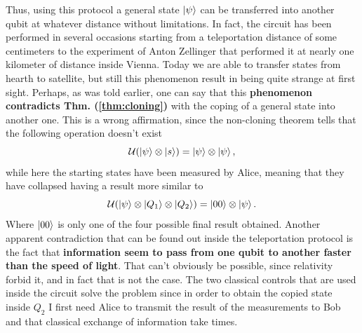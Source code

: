 Thus, using this protocol a general state $\ket{\psi}$ can be transferred into another qubit at whatever distance without limitations. In fact, the circuit has been performed in several occasions starting from a teleportation distance of some centimeters to the experiment of Anton Zellinger that performed it at nearly one kilometer of distance inside Vienna. Today we are able to transfer states from hearth to satellite, but still this phenomenon result in being quite strange at first sight. Perhaps, as was told earlier, one can say that this \textbf{phenomenon contradicts Thm. (\ref{thm:cloning})} with the coping of a general state into another one. This is a wrong affirmation, since the non-cloning theorem tells that the following operation doesn't exist
\begin{equation}
    \mathcal{U}(\ket{\psi}\otimes\ket{s}) = \ket{\psi}\otimes\ket{\psi},
\end{equation}
while here the starting states have been measured by Alice, meaning that they have collapsed having a result more similar to
\begin{equation}
    \mathcal{U}(\ket{\psi}\otimes\ket{Q_1}\otimes\ket{Q_2}) = \ket{00}\otimes\ket{\psi}.
\end{equation}
Where $\ket{00}$ is only one of the four possible final result obtained. Another apparent contradiction that can be found out inside the teleportation protocol is the fact that \textbf{information seem to pass from one qubit to another faster than the speed of light}. That can't obviously be possible, since relativity forbid it, and in fact that is not the case. The two classical controls that are used inside the circuit solve the problem since in order to obtain the copied state inside $Q_2$ I first need Alice to transmit the result of the measurements to Bob and that classical exchange of information take times.